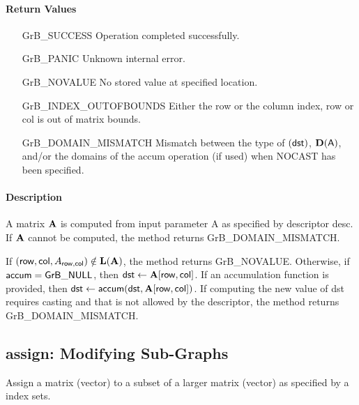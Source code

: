\paragraph{Return Values}

\begin{itemize}[leftmargin=2.1in]
\item[{\sf GrB\_SUCCESS}]          Operation completed successfully.
\item[{\sf GrB\_PANIC}]            Unknown internal error.
\item[{\sf GrB\_NOVALUE}]        No stored value at specified location.
\item[{\sf GrB\_INDEX\_OUTOFBOUNDS}]  Either the row or the column index,
                                      {\sf row} or {\sf col} is out of matrix bounds.
\item[{\sf GrB\_DOMAIN\_MISMATCH}]    Mismatch between the type of $(\sf dst)$, 
                                      $\bold{D}({\sf A})$, and/or the domains of the 
                                      {\sf accum} operation (if used) when {\sf NOCAST} has
                                      been specified.
\end{itemize}

\paragraph{Description}

A matrix ${\bf A}$ is computed from input parameter {\sf A} as specified by descriptor {\sf desc}.
If ${\bf A}$ cannot be computed, the method returns {\sf GrB\_DOMAIN\_MISMATCH}.

If $({\sf row},{\sf col}, A_{{\sf row},{\sf col}}) \notin \bold{L}({\bf A})$, the method returns {\sf GrB\_NOVALUE}.
Otherwise, if ${\sf accum} = {\sf GrB\_NULL}$, then ${\sf dst} \leftarrow {\bf A}[{\sf row},{\sf col}]$.
If an accumulation function is provided, then ${\sf dst} \leftarrow {\sf accum}({\sf dst},{\bf A}[{\sf row},{\sf col}])$.
If computing the new value of {\sf dst} requires casting and that is not allowed by the descriptor,
the method returns {\sf GrB\_DOMAIN\_MISMATCH}.

\subsection{{\sf assign}: Modifying Sub-Graphs}

Assign a matrix (vector) to a subset  of a larger matrix (vector) as specified by a index sets.

